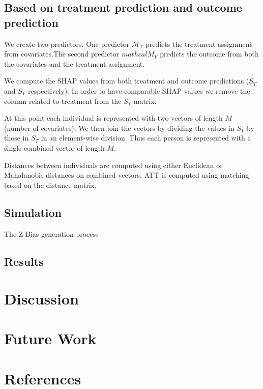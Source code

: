 \documentclass{article}
\begin{document}
\subsection{Based on treatment prediction and outcome prediction}
We create two predictors. One predictor $\mathcal{M}_T$ predicts the treatment assignment from covariates.The second predictor $mathcal{M}_Y$ predicts the outcome from both the covariates and the treatment assignment. 

We compute the SHAP values from both treatment and outcome predictions ($S_T$ and $S_Y$ respectively). In order to have comparable SHAP values we remove the column related to treatment from the $S_Y$ matrix. 

At this point each individual is represented with two vectors of length $M$ (number of covariates). We then join the vectors by dividing the values in $S_Y$ by those in $S_T$ in an element-wise division. Thus each person is represented with a single combined vector of length $M$.

Distances between individuals are computed using either Euclidean or Mahalanobis distances on combined vectors. ATT is computed using matching based on the distance matrix.

\subsection{Simulation}

The Z-Bias generation process \cite{myers2011effects}

\subsection{Results}


\section{Discussion}

\section{Future Work}

\section{References}



\end{document}
